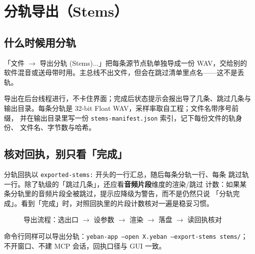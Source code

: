 \section{分轨导出（Stems）}

\subsection{什么时候用分轨}

「文件 $\to$ 导出分轨 (Stems)...」把每条源节点轨单独导成一份 WAV，交给别的
软件混音或送母带时用。主总线不出文件，但会在跳过清单里点名——这不是丢轨。

导出在后台线程进行，不卡住界面；完成后状态提示会报出导了几条、跳过几条与
输出目录。每条分轨是 32-bit Float WAV，采样率取自工程；文件名带序号前缀，
并在输出目录里写一份 \texttt{stems-manifest.json} 索引，记下每份文件的轨身份、
文件名、字节数与哈希。


\subsection{核对回执，别只看「完成」}

分轨回执以 \texttt{exported-stems:} 开头的一行汇总，随后每条分轨一行、每条
跳过轨一行。除了轨级的「跳过几条」，还应看\textbf{音频片段}维度的渲染/跳过
计数：如果某条分轨里的音频片段全被跳过，提示应降级为警告，而不是仍然只说
「分轨完成」。看到「完成」时，对照回执里的片段计数核对一遍是稳妥习惯。

\begin{figure}[htbp]
\centering
{}
\caption{导出流程：选出口 $\to$ 设参数 $\to$ 渲染 $\to$ 落盘 $\to$ 读回执核对}
\label{fig:ch08-export-flow}
\end{figure}

命令行同样可以导出分轨：\texttt{yeban-app --open X.yeban --export-stems stems/}；
不开窗口、不建 MCP 会话，回执口径与 GUI 一致。

